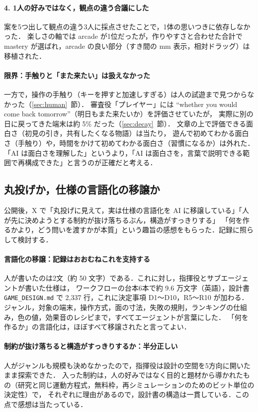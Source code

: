 \documentclass[a4paper,10pt]{ltjsarticle}
\newcommand{\secref}[1]{\ref{#1}~節}
\newcommand{\code}[1]{\texttt{#1}}
\begin{document}
\paragraph{4. 1人の好みではなく，観点の違う合議にした}
案を5つ出して観点の違う3人に採点させたことで，1体の思いつきに依存しなかった．
楽しさの軸では arcade が1位だったが，作りやすさと合わせた合計で mastery が選ばれ，arcade の良い部分（すき間の mm 表示，相対ドラッグ）は移植された．

\paragraph{限界：手触りと「また来たい」は扱えなかった}
一方で，操作の手触り（キーを押すと加速しすぎる）は人の試遊まで見つからなかった（\secref{sec:human}）．
審査役「プレイヤー」には ``whether you would come back tomorrow''（明日もまた来たいか）を評価させていたが，
実際に別の日に戻ってきた端末は約 5\% だった（\secref{sec:decay}）．
文章の上で評価できる面白さ（初見の引き，共有したくなる物語）は当たり，
遊んで初めてわかる面白さ（手触り）や，時間をかけて初めてわかる面白さ（習慣になるか）は外れた．
「AI は面白さを理解した」というより，「AI は面白さを，言葉で説明できる範囲で再構成できた」と言うのが正確だと考える．

\subsection{丸投げか，仕様の言語化の移譲か}
\label{sec:delegate}
公開後，X で「丸投げに見えて，実は仕様の言語化を AI に移譲している」「人が先に決めようとする制約が抜け落ちるぶん，構造がすっきりする」
「何を作るかより，どう問いを渡すかが本質」という趣旨の感想をもらった．記録に照らして検討する．

\paragraph{言語化の移譲：記録はおおむねこれを支持する}
人が書いたのは2文（約 50 文字）である．これに対し，指揮役とサブエージェントが書いた仕様は，
ワークフローの台本6本で約 9.6 万文字（英語），設計書 \code{GAME\_DESIGN.md} で 2,337 行，これに決定事項 D1〜D10，R5〜R10 が加わる．
ジャンル，対象の端末，操作方式，面の寸法，失敗の規則，ランキングの仕組み，色の値，効果音のレシピまで，すべてエージェントが言葉にした．
「何を作るか」の言語化は，ほぼすべて移譲されたと言ってよい．

\paragraph{制約が抜け落ちると構造がすっきりするか：半分正しい}
人がジャンルも規模も決めなかったので，指揮役は設計の空間を5方向に開いたまま探索できた．
入った制約は，人の好みではなく目的と題材から導かれたもの（研究と同じ運動方程式，無料枠，再シミュレーションのためのビット単位の決定性）で，
それぞれに理由があるので，設計書の構造は一貫している．この点で感想は当たっている．
\end{document}
